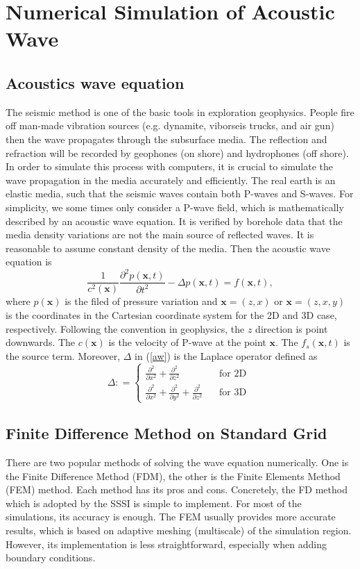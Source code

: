 \documentclass[12pt]{article}
\newcommand{\bx}{\boldsymbol{x}}
\theoremstyle{plain}
\theoremstyle{definition}
\theoremstyle{remark}
\numberwithin{equation}{section}
\begin{document}
\section{Numerical Simulation of Acoustic Wave}
\subsection{Acoustics wave equation}
The seismic method is one of the basic tools in exploration geophysics. People fire off man-made vibration sources (e.g. dynamite, viborseis trucks, and air gun) then the wave propagates through the subsurface media. The reflection and refraction will be recorded by geophones (on shore) and hydrophones (off shore). In order to simulate this process with computers, it is crucial to simulate the wave propagation in the media
accurately and efficiently. The real earth is an elastic media, such that the seismic waves contain both P-waves and S-waves. For simplicity, we some times only consider a P-wave field, which is mathematically described by an acoustic wave equation. It is verified by borehole data that the media density variations are not the main source of reflected waves. It is reasonable to assume constant density of the media. Then the acoustic wave equation is  
\begin{equation}\label{aw}
\frac{1}{c^2(\bx)}\frac{\partial^2 p(\bx,t)}{\partial t^2}-\Delta p(\bx,t)=f(\bx,t),
\end{equation}
where $p(\bx)$ is the filed of pressure variation and $\bx=(z,x)$ or $\bx=(z,x,y)$ is the coordinates in the Cartesian coordinate system for the 2D and 3D case, respectively. Following the convention in geophysics, the $z$ direction is point downwards. The $c(\bx)$ is the velocity of P-wave at the point $\bx$. The $f_s(\bx,t)$ is the source term. Moreover, $\Delta$ in (\ref{aw}) is the Laplace operator defined as 
\begin{equation}
\Delta: =\left\{
\begin{aligned}
\frac{\partial^2}{\partial x^2}+\frac{\partial^2}{\partial z^2}~~~~~~~ & ~~~~\text{for 2D }\\
\frac{\partial^2}{\partial x^2}+\frac{\partial^2}{\partial y^2}+\frac{\partial^2}{\partial z^2} &~~~~ \text{for 3D}
\end{aligned}
\right.  
\end{equation}

\subsection{Finite Difference Method on Standard Grid}
There are two popular methods of solving the wave equation numerically. One is the Finite Difference Method (FDM), the other is the Finite Elements Method (FEM) method. Each method has its pros and cons. Concretely, the FD method which is adopted by the SSSI is simple to implement. For most of the simulations, its accuracy is enough. The FEM usually provides more accurate results, which is based on adaptive meshing (multiscale) of the simulation region. However, its implementation is less straightforward, especially when adding boundary conditions.   
\end{document}
